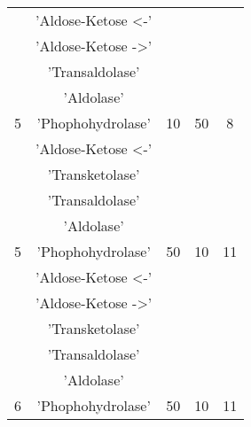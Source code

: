 \begin{center}
\begin{longtable}{ |c|c|c|c|c| }
 \hline
 & 'Aldose-Ketose <-' & & & \\
 & 'Aldose-Ketose ->' & & & \\
 & 'Transaldolase' & & & \\
 & 'Aldolase' & & & \\
5 & 'Phophohydrolase' & 10 & 50 & 8\\
 \hline
 & 'Aldose-Ketose <-' & & & \\
 & 'Transketolase' & & & \\
 & 'Transaldolase' & & & \\
 & 'Aldolase' & & & \\
5 & 'Phophohydrolase' & 50 & 10 & 11\\
 \hline
 & 'Aldose-Ketose <-' & & & \\
 & 'Aldose-Ketose ->' & & & \\
 & 'Transketolase' & & & \\
 & 'Transaldolase' & & & \\
 & 'Aldolase' & & & \\
6 & 'Phophohydrolase' & 50 & 10 & 11\\
 \hline
\end{longtable}
\end{center}
